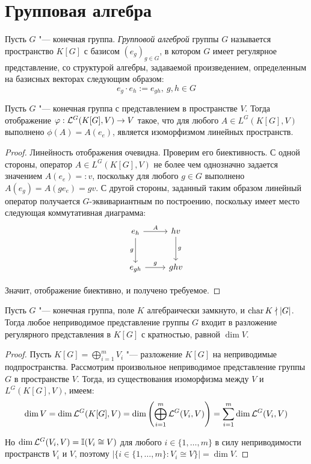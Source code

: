 \section{Групповая алгебра}

\begin{definition}
	Пусть $G$ "--- конечная группа. \textit{Групповой алгеброй} группы $G$ называется пространство $K[G]$ с базисом $(e_g)_{g \in G}$, в котором $G$ имеет регулярное представление, со структурой алгебры, задаваемой произведением, определенным на базисных векторах следующим образом:
	\[e_g \cdot e_h := e_{gh},~g, h \in G\]
\end{definition}

\begin{proposition}
	Пусть $G$ "--- конечная группа с представлением в пространстве $V$. Тогда отображение $\varphi: \mathcal L^G(K[G], V) \to V$ такое, что для любого $A \in L^G(K[G], V)$ выполнено $\phi(A) = A(e_e)$, является изоморфизмом линейных пространств.
\end{proposition}

\begin{proof}
	Линейность отображения очевидна. Проверим его биективность. С одной стороны, оператор $A \in L^G(K[G], V)$ не более чем однозначно задается значением $A(e_e) =: v$, поскольку для любого $g \in G$ выполнено $A(e_g) = A(ge_e) = gv$. С другой стороны, заданный таким образом линейный оператор получается $G$-эквивариантным по построению, поскольку имеет место следующая коммутативная диаграмма:
	\[
	\begin{tikzcd}[row sep = large]
		e_h \arrow[swap]{d}{g} \arrow{r}{A} & hv \arrow{d}{g}\\
		e_{gh} \arrow{r}{g} & ghv
	\end{tikzcd}
	\]
	
	Значит, отображение биективно, и получено требуемое.
\end{proof}

\begin{corollary}
	Пусть $G$ "--- конечная группа, поле $K$ алгебраически замкнуто, и $\operatorname{char}{K} \nmid |G|$. Тогда любое неприводимое представление группы $G$ входит в разложение регулярного представления в $K[G]$ с кратностью, равной $\dim{V}$.
\end{corollary}

\begin{proof}
	Пусть $K[G] = \bigoplus_{i = 1}^m V_i$ "--- разложение $K[G]$ на неприводимые подпространства. Рассмотрим произвольное неприводимое представление группы $G$ в пространстве $V$. Тогда, из существования изоморфизма между $V$ и $L^G(K[G], V)$, имеем:
	\[\dim{V} = \dim\mathcal L^G(K[G], V) = \dim \left(\bigoplus_{i = 1}^m\mathcal L^G(V_i, V)\right) = \sum_{i = 1}^m\dim\mathcal L^G(V_i, V)\]
	
	Но $\dim\mathcal L^G(V_i, V) = \mathbb I(V_i \cong V)$ для любого $i \in \{1, \dotsc, m\}$ в силу неприводимости пространств $V_i$ и $V$, поэтому $|\{i \in \{1, \dotsc, m\}: V_i \cong V\}| = \dim{V}$.
\end{proof}

